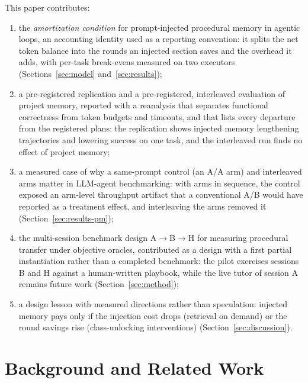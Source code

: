 \documentclass[smallcondensed,natbib]{svjour3}
\begin{document}
This paper contributes:
\begin{enumerate}
\item the \emph{amortization condition} for prompt-injected
  procedural memory in agentic loops, an accounting identity used as a
  reporting convention: it splits the net token balance into the
  rounds an injected section saves and the overhead it adds, with
  per-task break-evens measured on two executors
  (Sections~\ref{sec:model} and~\ref{sec:results});
\item a pre-registered replication and a pre-registered, interleaved
  evaluation of project memory, reported with a reanalysis that
  separates functional correctness from token budgets and timeouts,
  and that lists every departure from the registered plans: the
  replication shows injected memory lengthening trajectories and
  lowering success on one task, and the interleaved run finds no
  effect of project memory;
\item a measured case of why a same-prompt control (an A/A arm) and
  interleaved arms matter in LLM-agent benchmarking: with arms in
  sequence, the control exposed an arm-level throughput artifact that
  a conventional A/B would have reported as a treatment effect, and
  interleaving the arms removed it (Section~\ref{sec:results-pm});
\item the multi-session benchmark design A$\to$B$\to$H for measuring
  procedural transfer under objective oracles, contributed as a design
  with a first partial instantiation rather than a completed
  benchmark: the pilot exercises sessions B and H against a
  human-written playbook, while the live tutor of session A remains
  future work (Section~\ref{sec:method});
\item a design lesson with measured directions rather than
  speculation: injected memory pays only if the injection cost drops
  (retrieval on demand) or the round savings rise (class-unlocking
  interventions) (Section~\ref{sec:discussion}).
\end{enumerate}

\section{Background and Related Work}\label{sec:related}
\end{document}
